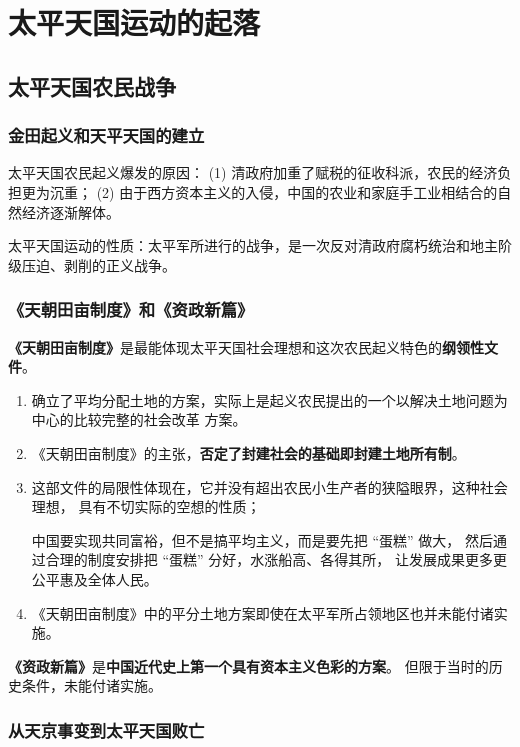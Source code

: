 \documentclass[10pt, UTF8]{ctexbook} %
\begin{document}
\section{太平天国运动的起落}

\subsection{太平天国农民战争}

\subsubsection{金田起义和天平天国的建立}

太平天国农民起义爆发的原因： (1) 清政府加重了赋税的征收科派，农民的经济负担更为沉重；
(2) 由于西方资本主义的入侵，中国的农业和家庭手工业相结合的自然经济逐渐解体。

太平天国运动的性质：太平军所进行的战争，是一次反对清政府腐朽统治和地主阶级压迫、剥削的正义战争。

\subsubsection{《天朝田亩制度》和《资政新篇》}

\textbf{《天朝田亩制度》}是最能体现太平天国社会理想和这次农民起义特色的\textbf{纲领性文件}。
\begin{enumerate}[label=(\arabic*), itemsep=0pt]
    \item 确立了平均分配土地的方案，实际上是起义农民提出的一个以解决土地问题为中心的比较完整的社会改革
    方案。
    \item《天朝田亩制度》的主张，\textbf{否定了封建社会的基础即封建土地所有制}。
    \item 这部文件的局限性体现在，它并没有超出农民小生产者的狭隘眼界，这种社会理想，
    具有不切实际的空想的性质；
    \begin{remark}
        中国要实现共同富裕，但不是搞平均主义，而是要先把 “蛋糕” 做大，
        然后通过合理的制度安排把 “蛋糕” 分好，水涨船高、各得其所，
        让发展成果更多更公平惠及全体人民。
    \end{remark}
    \item 《天朝田亩制度》中的平分土地方案即使在太平军所占领地区也并未能付诸实施。
\end{enumerate}

\textbf{《资政新篇》}是\textbf{中国近代史上第一个具有资本主义色彩的方案}。
但限于当时的历史条件，未能付诸实施。

\subsubsection{从天京事变到太平天国败亡}
\end{document}
